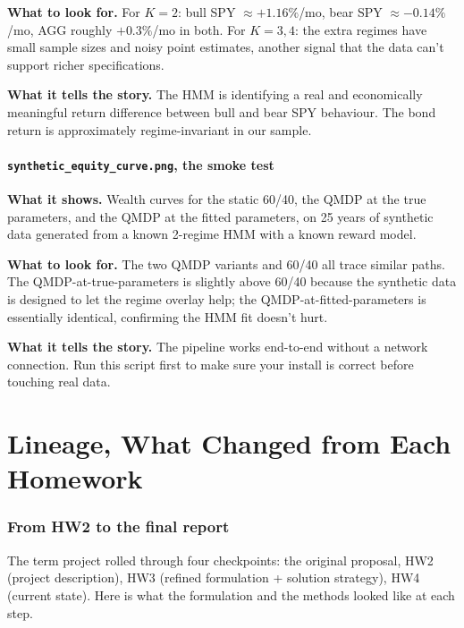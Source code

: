 \documentclass[11pt]{article}
\begin{document}
\textbf{What to look for.} For $K = 2$: bull SPY $\approx +1.16\%$/mo, bear SPY $\approx -0.14\%$/mo, AGG roughly $+0.3\%$/mo in both. For $K = 3, 4$: the extra regimes have small sample sizes and noisy point estimates, another signal that the data can't support richer specifications.

\textbf{What it tells the story.} The HMM is identifying a real and economically meaningful return difference between bull and bear SPY behaviour. The bond return is approximately regime-invariant in our sample.

\subsection{\texttt{synthetic\_equity\_curve.png}, the smoke test}

\textbf{What it shows.} Wealth curves for the static 60/40, the QMDP at the true parameters, and the QMDP at the fitted parameters, on 25 years of synthetic data generated from a known 2-regime HMM with a known reward model.

\textbf{What to look for.} The two QMDP variants and 60/40 all trace similar paths. The QMDP-at-true-parameters is slightly above 60/40 because the synthetic data is designed to let the regime overlay help; the QMDP-at-fitted-parameters is essentially identical, confirming the HMM fit doesn't hurt.

\textbf{What it tells the story.} The pipeline works end-to-end without a network connection. Run this script first to make sure your install is correct before touching real data.

\part{Lineage, What Changed from Each Homework}

\section{From HW2 to the final report}

The term project rolled through four checkpoints: the original proposal, HW2 (project description), HW3 (refined formulation + solution strategy), HW4 (current state). Here is what the formulation and the methods looked like at each step.
\end{document}
